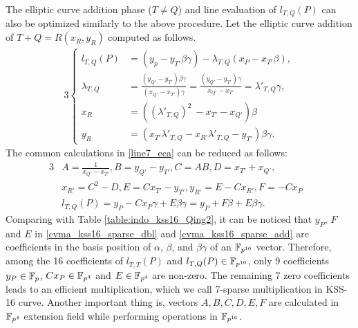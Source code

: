 The elliptic curve addition phase ($T\neq Q$) and line evaluation of $ l_{T,Q}(P)$ can also be optimized similarly to the above procedure.
Let the elliptic curve addition of $T+Q = R(x_R, y_R)$ computed as follows.
\begin{alignat}{3}
\begin{cases}\label{line7_eca}
l_{T,Q}(P)& = (y_p-y_{T'}\beta \gamma)- \lambda_{T,Q}(x_P-x_{T'}\beta),\\
\lambda_{T,Q} &= \frac{( y_{Q'}-y_{T'})\beta\gamma }{( x_{Q'}-x_{T'})\gamma} = \frac{( y_{Q'}-y_{T'}) \gamma}{x_{Q'}-x_{T'}} = \lambda'_{T,Q} \gamma, \\
x_{R} &= ((\lambda'_{T,Q})^2  \ - x_{T'} -x_{Q'})\beta  \\
y_{R} &= (x_{T'}\lambda'_{T,Q} -x_{R'}\lambda'_{T,Q}-y_{T'})\beta \gamma.
\end{cases}
\end{alignat}
The common calculations in \eqref{line7_eca} can be reduced as follows: 
\begin{alignat}{3}
&A=\frac{1}{x_{Q'}-x_{T'}}, B=y_{Q'}-y_{T'}, C=AB, D=x_{T'}+x_{Q'},&\nonumber\\
& x_{R'}=C^2-D, E= Cx_{T'}-y_{T'}, y_{R'}=E-Cx_{R'},  F=-Cx_P &\nonumber\\
&l_{T,Q}(P)= y_P-Cx_P\gamma +E \beta\gamma = y_P+F\beta+E\beta \gamma. &\label{cvma_kss16_sparse_add}
\end{alignat}
Comparing with Table \ref{table:indo_kss16_Qing2}, it can be noticed that $y_P$, $F$ and $E$ in \eqref{cvma_kss16_sparse_dbl} and \eqref{cvma_kss16_sparse_add} are coefficients in the basis position of $\alpha$, $\beta$, and $\beta\gamma$ of an $\mathbb{F}_{p^{16}}$ vector.
Therefore,  among the 16 coefficients of  $l_{T,T}(P)$ and $l_{T,Q}(P)\in \mathbb{F}_{p^{16}}$, only 9 coefficients $y_P\in {\mathbb{F}}_{p}$, $Cx_P\in \mathbb{F}_{p^4}$ and $E\in \mathbb{F}_{p^4}$ are  non-zero.
The remaining 7 zero coefficients leads to an efficient multiplication, which we call 7-sparse multiplication in KSS-16 curve. 
Another important thing is, vectors $A,B,C, D, E, F$  are calculated in $\mathbb{F}_{p^4}$ extension field while performing operations in $\mathbb{F}_{p^{16}}$.
